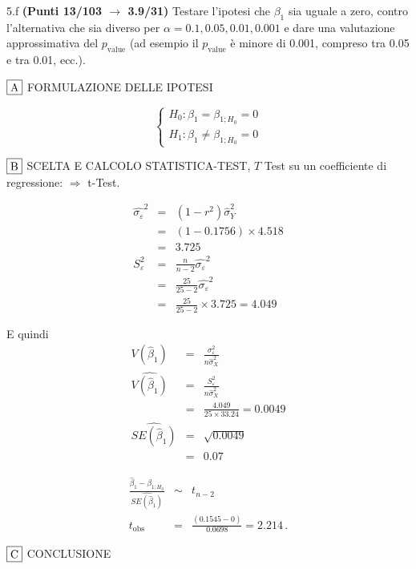 \documentclass[
  11pt,
]{book}
\theoremstyle{mytheoremstyle}
\theoremstyle{mydefstyle}
\newenvironment{sol}
  {
  \begin{tcolorbox}[enhanced,breakable,arc=0.1mm,boxrule=1pt,colback=white,colframe=iblue,
  title=\bf \fontfamily{lmss}\selectfont \hspace{.5 cm} Soluzione,drop fuzzy shadow]

}{
\end{tcolorbox}
  }
\begin{document}
5.f \textbf{(Punti 13/103 \(\rightarrow\) 3.9/31)} Testare l'ipotesi che \(\beta_1\) sia uguale a zero, contro l'alternativa che sia diverso per \(\alpha=0.1,0.05,0.01,0.001\) e dare una valutazione approssimativa del \(p_\text{value}\) (ad esempio il \(p_\text{value}\) è minore di 0.001, compreso tra 0.05 e tra 0.01, ecc.).

\begin{sol}
\(\fbox{A}\) FORMULAZIONE DELLE IPOTESI

\[\begin{cases}
   H_0: \beta_1 = \beta_{1;H_0}=0 \\
   H_1: \beta_1 \neq \beta_{1;H_0}=0 
   \end{cases}\]

\(\fbox{B}\) SCELTA E CALCOLO STATISTICA-TEST, \(T\)
Test su un coefficiente di regressione: \(\Rightarrow\) t-Test.

\begin{eqnarray*}
\hat{\sigma_\varepsilon}^2&=&(1-r^2)\hat\sigma_Y^2\\
&=& (1- 0.1756 )\times 4.518 \\
   &=&  3.725 \\
   S_\varepsilon^2 &=& \frac{n} {n-2} \hat{\sigma_\varepsilon}^2\\
   &=&  \frac{ 25 } { 25 -2} \hat{\sigma_\varepsilon}^2 \\
 &=&  \frac{ 25 } { 25 -2} \times  3.725  =  4.049  
\end{eqnarray*}

E quindi\begin{eqnarray*}
V(\hat\beta_{1}) &=& \frac{\sigma_{\varepsilon}^{2}} {n \hat{\sigma}^{2}_{X}} \\
\widehat{V(\hat\beta_{1})} &=& \frac{S_{\varepsilon}^{2}} {n \hat{\sigma}^{2}_{X}} \\
 &=& \frac{ 4.049 } { 25 \times  33.24 } =  0.0049 \\
 \widehat{SE(\hat\beta_{1})}        &=&  \sqrt{ 0.0049 }\\
 &=&  0.07 
\end{eqnarray*}

\begin{eqnarray*}
 \frac{\hat\beta_{ 1 } - \beta_{ 1 ;H_0}} {\widehat{SE(\hat\beta_{ 1 })}}&\sim&t_{n-2}\\
   t_{\text{obs}}
&=& \frac{ ( 0.1545 -  0 )} { 0.0698 }
 =   2.214 \, .
\end{eqnarray*}

\(\fbox{C}\) CONCLUSIONE


\end{sol}
\end{document}
